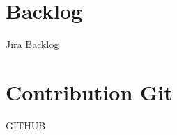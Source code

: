 \begin{appendices}
\section{Backlog}\label{appen:backlog}
Jira Backlog

\newpage
\section{Contribution Git}\label{appen:git_contribution}
GITHUB
\end{appendices}
